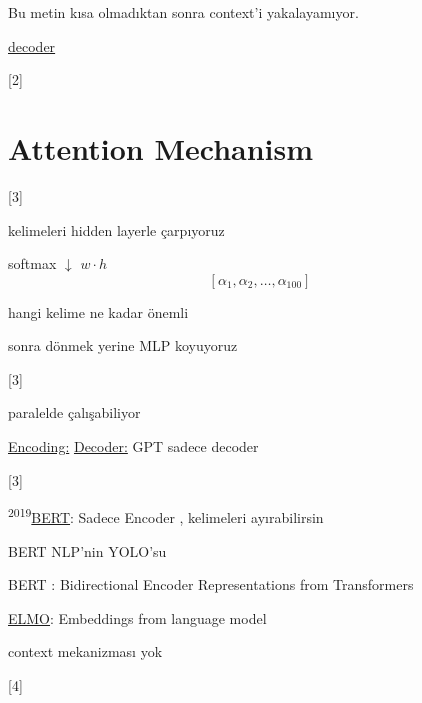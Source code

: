\documentclass[11pt,a4paper]{article}
\begin{document}
Bu metin kısa olmadıktan sonra context'i yakalayamıyor.

\textcolor{kirmizikalem}{\underline{decoder}}

[2]

\section{Attention Mechanism}
[3]

kelimeleri hidden layerle çarpıyoruz

softmax $\downarrow$ \quad $w\cdot h$
\[ [\alpha_1,\alpha_2,\dots,\alpha_{100}] \]

hangi kelime ne kadar önemli

sonra dönmek yerine MLP koyuyoruz

[3]

paralelde çalışabiliyor

\textcolor{kirmizikalem}{\underline{Encoding:}} \hspace{5em} \textcolor{kirmizikalem}{\underline{Decoder:}} \hspace{2em} \textcolor{kirmizikalem}{GPT sadece decoder}

[3]


\medskip
\textsuperscript{2019}\underline{BERT}: Sadece Encoder , kelimeleri ayırabilirsin

\hspace*{1.5em}BERT NLP'nin YOLO'su

BERT : Bidirectional Encoder Representations from Transformers

\underline{ELMO}: Embeddings from language model

context mekanizması yok

[4]
\end{document}
